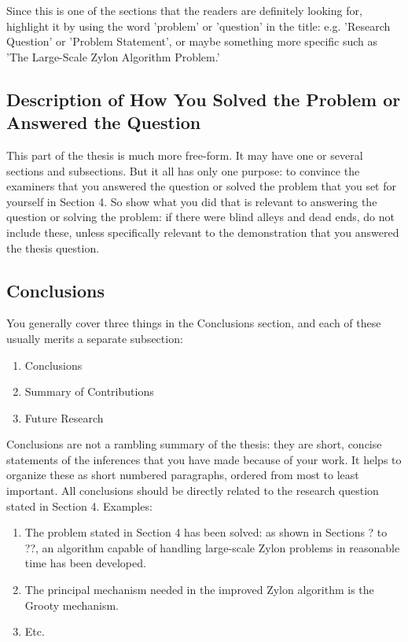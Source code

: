 Since this is one of the sections that the readers are definitely looking for, highlight it by using the word 'problem' or 'question' in the title: e.g. 'Research Question' or 'Problem Statement', or maybe something more specific such as 'The Large-Scale Zylon Algorithm Problem.'

\subsection{Description of How You Solved the Problem or Answered the Question}

This part of the thesis is much more free-form. It may have one or several sections and subsections. But it all has only one purpose: to convince the examiners that you answered the question or solved the problem that you set for yourself in Section 4. So show what you did that is relevant to answering the question or solving the problem: if there were blind alleys and dead ends, do not include these, unless specifically relevant to the demonstration that you answered the thesis question.

\subsection{Conclusions}

You generally cover three things in the Conclusions section, and each of these usually merits a separate subsection:

\begin{enumerate}
	\item Conclusions
	\item Summary of Contributions
	\item Future Research
\end{enumerate}

Conclusions are not a rambling summary of the thesis: they are short, concise statements of the inferences that you have made because of your work. It helps to organize these as short numbered paragraphs, ordered from most to least important. All conclusions should be directly related to the research question stated in Section 4. Examples:

\begin{enumerate}
	\item The problem stated in Section 4 has been solved: as shown in Sections ? to ??, an algorithm capable of handling large-scale Zylon problems in reasonable time has been developed.
	\item The principal mechanism needed in the improved Zylon algorithm is the Grooty mechanism.
	\item Etc.
\end{enumerate}

